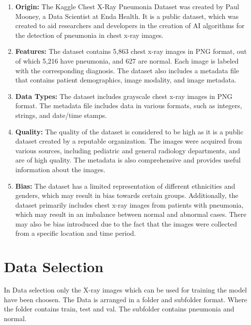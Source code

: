 \begin{enumerate}
	\item \textbf{Origin:} The Kaggle Chest X-Ray Pneumonia Dataset was created by Paul Mooney, a Data Scientist at Enda Health. It is a public dataset, which was created to aid researchers and developers in the creation of AI algorithms for the detection of pneumonia in chest x-ray images.\autocite{Mooney:2018}
	
	\item \textbf{Features:} The dataset contains 5,863 chest x-ray images in PNG format, out of which 5,216 have pneumonia, and 627 are normal. Each image is labeled with the corresponding diagnosis. The dataset also includes a metadata file that contains patient demographics, image modality, and image metadata.\\
	
	\item \textbf{Data Types:} The dataset includes grayscale chest x-ray images in PNG format. The metadata file includes data in various formats, such as integers, strings, and date/time stamps.\\
	
	\item \textbf{Quality:} The quality of the dataset is considered to be high as it is a public dataset created by a reputable organization. The images were acquired from various sources, including pediatric and general radiology departments, and are of high quality. The metadata is also comprehensive and provides useful information about the images.\\
	
	\item \textbf{Bias:} The dataset has a limited representation of different ethnicities and genders, which may result in bias towards certain groups. Additionally, the dataset primarily includes chest x-ray images from patients with pneumonia, which may result in an imbalance between normal and abnormal cases. There may also be bias introduced due to the fact that the images were collected from a specific location and time period.\\
	
\end{enumerate}

\section{Data Selection}

In Data selection only the X-ray images which can be used for training the model have been choosen. The Data is arranged in a folder and subfolder format. Where the folder contains train, test and val. The subfolder contains pneumonia and normal.
 \bigskip

